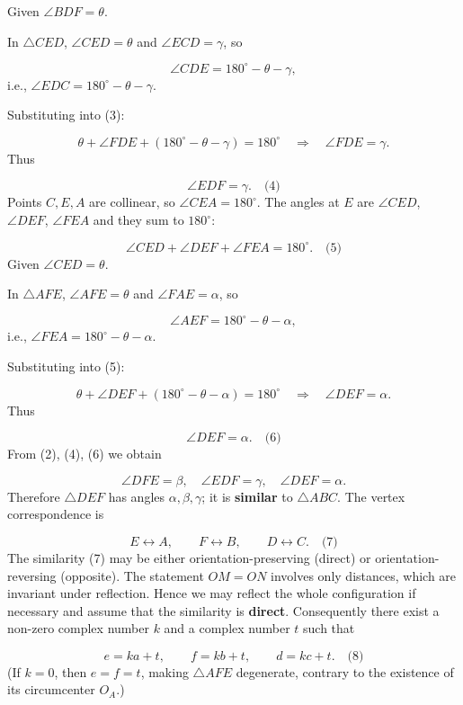 Given \(\angle BDF = \theta\).\par
In \(\triangle CED\), \(\angle CED = \theta\) and \(\angle ECD = \gamma\), so\par
\[
\angle CDE = 180^\circ - \theta - \gamma,
\]
i.e., \(\angle EDC = 180^\circ - \theta - \gamma\).\par
Substituting into (3):\par
\[
\theta + \angle FDE + (180^\circ - \theta - \gamma) = 180^\circ \quad\Longrightarrow\quad \angle FDE = \gamma.
\]
Thus\par
\[
\angle EDF = \gamma. \quad\text{(4)}
\]
Points \(C,E,A\) are collinear, so \(\angle CEA = 180^\circ\). The angles at \(E\) are \(\angle CED\), \(\angle DEF\), \(\angle FEA\) and they sum to \(180^\circ\):\par
\[
\angle CED + \angle DEF + \angle FEA = 180^\circ. \quad\text{(5)}
\]
Given \(\angle CED = \theta\).\par
In \(\triangle AFE\), \(\angle AFE = \theta\) and \(\angle FAE = \alpha\), so\par
\[
\angle AEF = 180^\circ - \theta - \alpha,
\]
i.e., \(\angle FEA = 180^\circ - \theta - \alpha\).\par
Substituting into (5):\par
\[
\theta + \angle DEF + (180^\circ - \theta - \alpha) = 180^\circ \quad\Longrightarrow\quad \angle DEF = \alpha.
\]
Thus\par
\[
\angle DEF = \alpha. \quad\text{(6)}
\]
From (2), (4), (6) we obtain\par
\[
\angle DFE = \beta,\quad \angle EDF = \gamma,\quad \angle DEF = \alpha.
\]
Therefore \(\triangle DEF\) has angles \(\alpha,\beta,\gamma\); it is \textbf{similar} to \(\triangle ABC\). The vertex correspondence is\par
\[
E \longleftrightarrow A,\qquad F \longleftrightarrow B,\qquad D \longleftrightarrow C. \quad\text{(7)}
\]
\smallskip
{}
The similarity (7) may be either orientation-preserving (direct) or orientation-reversing (opposite). The statement \(OM = ON\) involves only distances, which are invariant under reflection. Hence we may reflect the whole configuration if necessary and assume that the similarity is \textbf{direct}. Consequently there exist a non-zero complex number \(k\) and a complex number \(t\) such that\par
\[
e = k a + t,\qquad f = k b + t,\qquad d = k c + t. \quad\text{(8)}
\]
(If \(k=0\), then \(e=f=t\), making \(\triangle AFE\) degenerate, contrary to the existence of its circumcenter \(O_A\).)\par
